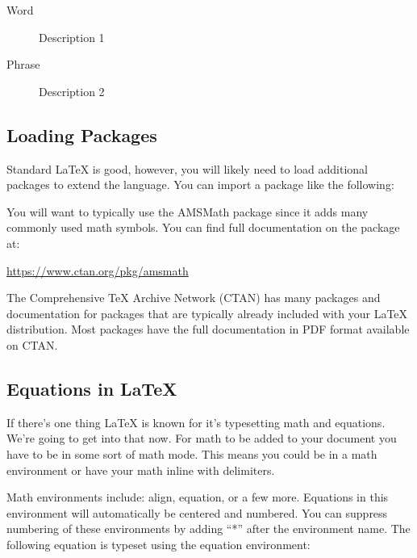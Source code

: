 \begin{center}
\begin{latexcode}
\begin{description}
\item[Word] Description 1
\item[Phrase] Description 2
\end{description}
\end{latexcode}
\end{center}

\subsection{Loading Packages}
Standard \LaTeX{} is good, however, you will likely need to load additional packages to extend the language. You can import a package like the following:

\begin{center}
\begin{latexcode}
\usepackage{amsmath}
\end{latexcode}
\end{center}
You will want to typically use the AMSMath package since it adds many commonly used math symbols. You can find full documentation on the package at:

\begin{center}
	\url{https://www.ctan.org/pkg/amsmath}
\end{center}

The Comprehensive \TeX{} Archive Network (CTAN) has many packages and documentation for packages that are typically already included with your \LaTeX{} distribution. Most packages have the full documentation in PDF format available on CTAN.


\subsection{Equations in \LaTeX{}}
If there's one thing \LaTeX{} is known for it's typesetting math and equations. We're going to get into that now. For math to be added to your document you have to be in some sort of math mode. This means you could be in a math environment or have your math inline with delimiters. 

Math environments include: align, equation, or a few more. Equations in this environment will automatically be centered and numbered. You can suppress numbering of these environments by adding ``*'' after the environment name. The following equation is typeset using the equation environment:


